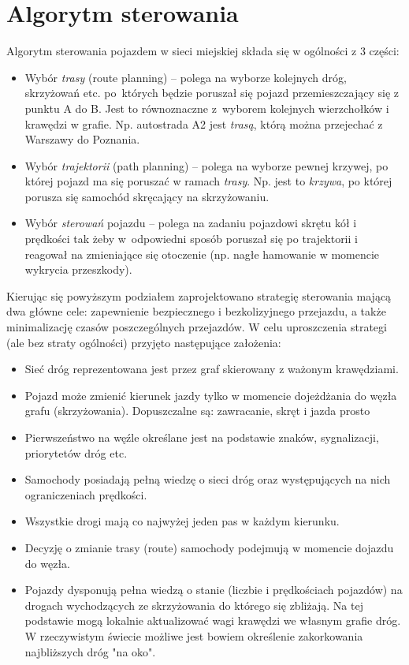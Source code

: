 \section{Algorytm sterowania}

Algorytm sterowania pojazdem w sieci miejskiej składa się w ogólności z 3 części:

\begin{itemize}
	\item 
	Wybór \textit{trasy} (route planning) -- polega na wyborze kolejnych dróg, skrzyżowań etc. po~których będzie poruszał się pojazd przemieszczający się z punktu A do B. Jest to równoznaczne z~wyborem kolejnych wierzchołków i krawędzi w grafie. Np. autostrada A2 jest \textit{trasą}, którą można przejechać z Warszawy do Poznania. 
	\item 
	Wybór \textit{trajektorii} (path planning) -- polega na wyborze pewnej krzywej, po której pojazd ma się poruszać w ramach \textit{trasy}. Np. jest to \textit{krzywa}, po której porusza się samochód skręcający na skrzyżowaniu.
	\item 
	Wybór \textit{sterowań} pojazdu -- polega na zadaniu pojazdowi skrętu kół i prędkości tak żeby w~odpowiedni sposób poruszał się po trajektorii i reagował na zmieniające się otoczenie (np. nagłe hamowanie w momencie wykrycia przeszkody).
\end{itemize}

Kierując się powyższym podziałem zaprojektowano strategię sterowania mającą dwa główne cele: zapewnienie bezpiecznego i bezkolizyjnego przejazdu, a także minimalizację czasów poszczególnych przejazdów. W celu uproszczenia strategi (ale bez straty ogólności) przyjęto następujące założenia:

\begin{itemize}
	\item 
	Sieć dróg reprezentowana jest przez graf skierowany z ważonym krawędziami.	
	\item 
	Pojazd może zmienić kierunek jazdy tylko w momencie dojeżdżania do węzła grafu (skrzyżowania). Dopuszczalne są: zawracanie, skręt i jazda prosto 
	\item 
	Pierwszeństwo na węźle określane jest na podstawie znaków, sygnalizacji, priorytetów dróg etc.
	\item 
	Samochody posiadają pełną wiedzę o sieci dróg oraz występujących na nich ograniczeniach prędkości.
	\item 
	Wszystkie drogi mają co najwyżej jeden pas w każdym kierunku.
	\item 
	Decyzję o zmianie trasy (route) samochody podejmują	w momencie dojazdu do węzła.
	\item
	Pojazdy dysponują pełna wiedzą o stanie (liczbie i prędkościach pojazdów) na drogach wychodzących ze skrzyżowania do którego się zbliżają. Na tej podstawie mogą lokalnie aktualizować wagi krawędzi we własnym grafie dróg. W rzeczywistym świecie możliwe jest bowiem określenie zakorkowania najbliższych dróg "na oko".
	
\end{itemize}

